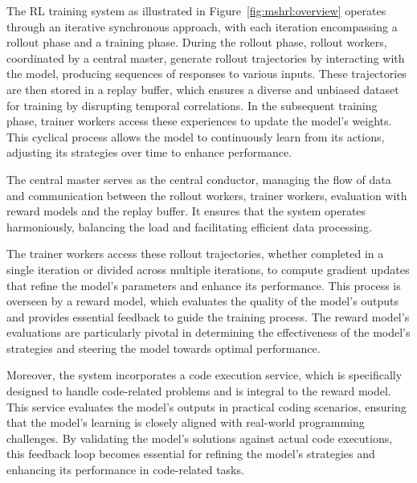 \documentclass{article}
\begin{document}
The RL training system as illustrated in Figure~\ref{fig:mshrl:overview} operates through an iterative synchronous approach, with each iteration encompassing a rollout phase and a training phase. During the rollout phase, rollout workers, coordinated by a central master, generate rollout trajectories by interacting with the model, producing sequences of responses to various inputs. These trajectories are then stored in a replay buffer, which ensures a diverse and unbiased dataset for training by disrupting temporal correlations. In the subsequent training phase, trainer workers access these experiences to update the model's weights. This cyclical process allows the model to continuously learn from its actions, adjusting its strategies over time to enhance performance.

The central master serves as the central conductor, managing the flow of data and communication between the rollout workers, trainer workers, evaluation with reward models and the replay buffer. It ensures that the system operates harmoniously, balancing the load and facilitating efficient data processing.

The trainer workers access these rollout trajectories, whether completed in a single iteration or divided across multiple iterations, to compute gradient updates that refine the model's parameters and enhance its performance. This process is overseen by a reward model, which evaluates the quality of the model's outputs and provides essential feedback to guide the training process. The reward model's evaluations are particularly pivotal in determining the effectiveness of the model's strategies and steering the model towards optimal performance.

Moreover, the system incorporates a code execution service, which is specifically designed to handle code-related problems and is integral to the reward model. This service evaluates the model's outputs in practical coding scenarios, ensuring that the model's learning is closely aligned with real-world programming challenges. By validating the model's solutions against actual code executions, this feedback loop becomes essential for refining the model's strategies and enhancing its performance in code-related tasks.
\end{document}
